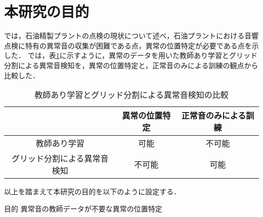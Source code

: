 \documentclass[../main]{subfiles}
\begin{document}
\section{本研究の目的}
\label{sec:intro_my_purpose}

では，石油精製プラントの点検の現状について述べ，石油プラントにおける音響点検に特有の異常音の収集が困難である点，異常の位置特定が必要である点を示した．
では，表\ref{tab:comparison}に示すように，異常のデータを用いた教師あり学習とグリッド分割による異常音検知を，異常の位置特定と，正常音のみによる訓練の観点から比較した．

\begin{table}[htbp]
  \centering
  \caption{教師あり学習とグリッド分割による異常音検知の比較}
  \label{tab:comparison}
  \begin{tabular}{|c|c|c|}
  \hline
   & 異常の位置特定 & 正常音のみによる訓練 \\ \hline
  教師あり学習 & 可能 & 不可能 \\ \hline
  グリッド分割による異常音検知 & 不可能 & 可能 \\ \hline
  \end{tabular}
\end{table}


以上を踏まえて本研究の目的を以下のように設定する．
\bigskip
\begin{itembox}[c]{目的}
  \centering
  異常音の教師データが不要な異常の位置特定
\end{itembox}
\end{document}
